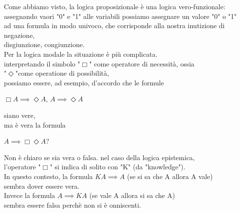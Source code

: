 \documentclass[a4paper,12pt]{article}
\theoremstyle{def}
\theoremstyle{prop}
\theoremstyle{esempio}
\theoremstyle{dimostrazione}
\theoremstyle{teo}
\theoremstyle{osservazione}
\begin{document}
\newpage
Come abbiamo visto, la logica proposizionale è una logica vero-funzionale:\\
assegnando vaori "0" e "1" alle variabili possiamo assegnare un valore "0" o "1"\\
ad una formula in modo univoco, che corrisponde alla nostra inutizione di negazione,\\
disgiunzione, congiunzione.\\
Per la logica modale la situazione è più complicata.\\
interpretando il simbolo "\(\Box\)" come operatore di necessità, ossia\\
"\(\Diamond\)"come operatione di possibilità,\\
possiamo essere, ad esempio, d'accordo che le formule
\begin{center}
	\(\Box A \implies \Diamond A\), \(A \implies \Diamond A\)
\end{center}
siano vere,\\
ma è vera la formula
\begin{center}
	\(A \implies \Box \Diamond A\)?
\end{center}
Non è chiaro se sia vera o falsa. nel caso della logica epistemica,\\
l'operatore "\(\Box\)" si indica di solito con "K" (da "knowledge").\\
In questo contesto, la formula \(KA \implies A\) (se si sa che A allora A vale)\\
sembra dover essere vera.\\
Invece la formula \(A \implies KA\) (se vale A allora si sa che A)\\
sembra essere falsa perchè non si è onniscenti.\\
\newpage
\end{document}
